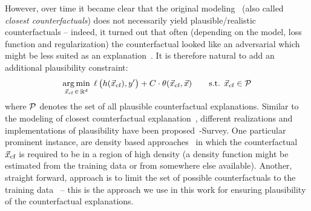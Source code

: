 However, over time it became clear that the original modeling~ (also called \textit{closest counterfactuals}) does not necessarily yield plausible/realistic counterfactuals -- indeed, it turned out that often (depending on the model, loss function and regularization) the counterfactual looked like an adversarial which might be less suited as an explanation~\citep{laugel_counterfactuals_2019}. It is therefore natural to add an additional plausibility constraint:
\begin{equation}
\begin{split}
\underset{{\vec{x}_{\text{cf}}} \,\in\, \mathbb{R}^d}{\arg\min}\; \operatorname*{{\ell}}\big(h({\vec{x}_{\text{cf}}}), y'\big) + C \cdot \operatorname*{{\theta}}({\vec{x}_{\text{cf}}}, \vec{x}) \quad\quad \text{s.t. } {\vec{x}_{\text{cf}}} \in \mathcal{P}
\end{split}
\end{equation}
where $\mathcal{P}$ denotes the set of all plausible counterfactual explanations.
Similar to the modeling of closest counterfactual explanation~, different realizations and implementations of plausibility have been proposed~\citep{looveren_counterfactuals_2019,poyiadzi_face_2019,farkas_convex_2020}-Survey. One particular prominent instance, are density based approaches~\citep{farkas_convex_2020} in which the counterfactual ${\vec{x}_{\text{cf}}}$ is required to be in a region of high density (a density function might be estimated from the training data or from somewhere else available). Another, straight forward, approach is to limit the set of possible counterfactuals to the training data~\citep{poyiadzi_face_2019} -- this is the approach we use in this work for ensuring plausibility of the counterfactual explanations.


